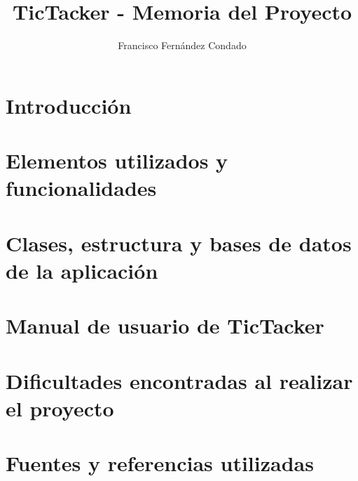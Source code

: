 \documentclass[12pt,oneside,letterpaper,spanish]{article}
\title{TicTacker - Memoria del Proyecto} %
\author{Francisco Fernández Condado}
\begin{document}


\newpage
\doublespacing
\renewcommand{\baselinestretch}{1}\normalsize
\tableofcontents
\renewcommand{\baselinestretch}{1}\normalsize
\thispagestyle{fancy} %



\newpage

\section{Introducción} \label{ch1}


\section{Elementos utilizados y funcionalidades} \label{ch2}
 

\section{Clases, estructura y bases de datos de la aplicación} \label{ch3}


\section{Manual de usuario de TicTacker} \label{ch4}


\section{Dificultades encontradas al realizar el proyecto} \label{ch5}


\section{Fuentes y referencias utilizadas} \label{ch6}


\label{EndOfText}

%

% 
%


\label{endOfDoc}
\end{document}
